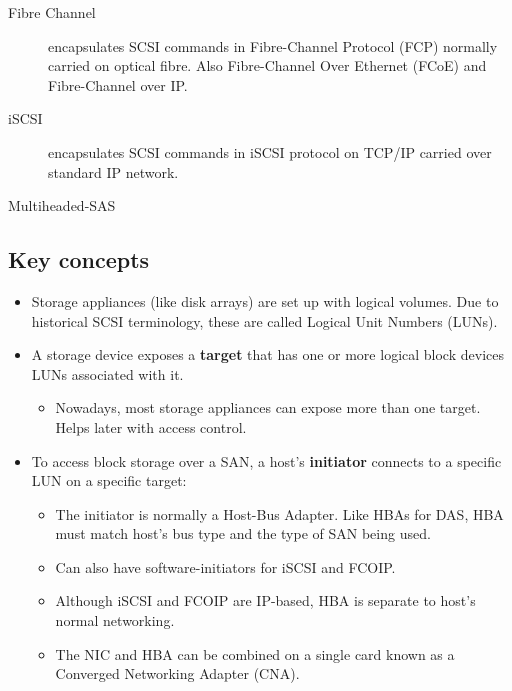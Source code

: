 \begin{description}
\item[Fibre Channel]
encapsulates SCSI commands in Fibre-Channel Protocol (FCP) normally
carried on optical fibre. Also Fibre-Channel Over Ethernet (FCoE) and
Fibre-Channel over IP.
\item[iSCSI]
encapsulates SCSI commands in iSCSI protocol on TCP/IP carried over
standard IP network.
\item[Multiheaded-SAS]
\end{description}

\subsection{Key concepts}
\label{sec:key-concepts}

\begin{itemize}
\item
  Storage appliances (like disk arrays) are set up with logical volumes.
  Due to historical SCSI terminology, these are called Logical Unit
  Numbers (LUNs).
\item
  A storage device exposes a \textbf{target} that has one or more
  logical block devices LUNs associated with it.

  \begin{itemize}
  
  \item
    Nowadays, most storage appliances can expose more than one target.
    Helps later with access control.
  \end{itemize}
\item
  To access block storage over a SAN, a host's \textbf{initiator}
  connects to a specific LUN on a specific target:

  \begin{itemize}
  \item
    The initiator is normally a Host-Bus Adapter. Like HBAs for DAS, HBA
    must match host's bus type and the type of SAN being used.
  \item
    Can also have software-initiators for iSCSI and FCOIP.
  \item
    Although iSCSI and FCOIP are IP-based, HBA is separate to host's
    normal networking.
  \item
    The NIC and HBA can be combined on a single card known as a
    Converged Networking Adapter (CNA).
  \end{itemize}
\end{itemize}

